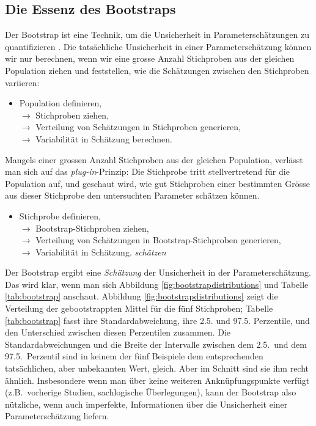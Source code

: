 \documentclass[oneside, 10pt]{book}\usepackage[]{graphicx}\usepackage[]{xcolor}
\begin{document}
\subsection{Die Essenz des Bootstraps}
Der Bootstrap ist eine Technik,
um die Unsicherheit in Parameterschätzungen
zu quantifizieren \citep{Efron1979,Efron1993}. Die tatsächliche Unsicherheit in einer Parameterschätzung
können wir nur berechnen, wenn wir eine grosse Anzahl Stichproben aus der gleichen
Population ziehen und feststellen, wie die Schätzungen zwischen den Stichproben
variieren:
\begin{itemize}
\item Population definieren,\\
$\rightarrow$ Stichproben ziehen,\\
$\rightarrow$ Verteilung von Schätzungen in Stichproben generieren,\\
$\rightarrow$ Variabilität in Schätzung berechnen.
\end{itemize}

Mangels einer grossen Anzahl Stichproben aus der gleichen Population,
verlässt man sich auf das \textit{plug-in}-Prinzip: Die Stichprobe
tritt stellvertretend für die Population auf, und geschaut wird,
wie gut Stichproben einer bestimmten Grösse aus dieser Stichprobe
den untersuchten Parameter schätzen können.
\begin{itemize}
\item Stichprobe definieren, \\
$\rightarrow$ Bootstrap-Stichproben ziehen, \\
$\rightarrow$ Verteilung von Schätzungen in Bootstrap-Stichproben generieren, \\
$\rightarrow$ Variabilität in Schätzung. \emph{schätzen}
\end{itemize}

Der Bootstrap ergibt eine \emph{Schätzung}
der Unsicherheit in der Parameterschätzung.
Das wird klar, wenn man sich Abbildung
\vref{fig:bootstrapdistributions}
und Tabelle \ref{tab:bootstrap} anschaut.
Abbildung \ref{fig:bootstrapdistributions} zeigt die
Verteilung der gebootstrappten Mittel für die fünf Stichproben;
Tabelle \ref{tab:bootstrap} fasst ihre Standardabweichung,
ihre 2.5. und 97.5. Perzentile, und den Unterschied zwischen
diesen Perzentilen zusammen.
Die Standardabweichungen und die Breite der Intervalle
zwischen dem 2.5.\ und dem 97.5.\ Perzentil sind in keinem
der fünf Beispiele dem entsprechenden
tatsächlichen, aber unbekannten Wert, gleich.
Aber im Schnitt sind sie ihm recht ähnlich.
Insbesondere wenn man über keine weiteren Anknüpfungspunkte
verfügt
(z.B.\ vorherige Studien, sachlogische Überlegungen),
kann der Bootstrap also nützliche, wenn auch imperfekte,
Informationen über
die Unsicherheit einer Parameterschätzung liefern.
\end{document}
